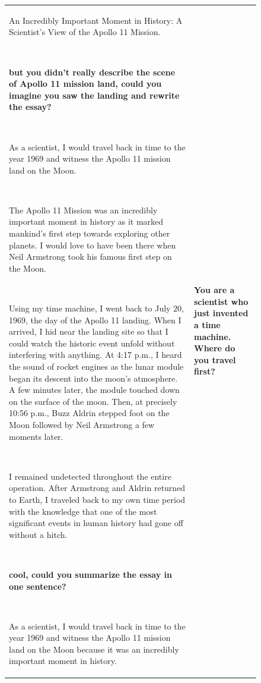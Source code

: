 \documentclass{article}
\begin{document}
\begin{figure}[p]
\begin{tabular}{@{}p{}p{}@{}}
    An Incredibly Important Moment in History: A Scientist's View of the Apollo 11 Mission.
    
    ~
    
    \textcolor[HTML]{3078BE}{\textbf{but you didn't really describe the scene of Apollo 11 mission land, could you imagine you saw the landing and rewrite the essay?}}
    
    ~
    
    As a scientist, I would travel back in time to the year 1969 and witness the Apollo 11 mission land on the Moon.
    
    ~
    
    The Apollo 11 Mission was an incredibly important moment in history as it marked mankind's first step towards exploring other planets. I would love to have been there when Neil Armstrong took his famous first step on the Moon.
    
    ~
    
    Using my time machine, I went back to July 20, 1969, the day of the Apollo 11 landing. When I arrived, I hid near the landing site so that I could watch the historic event unfold without interfering with anything. At 4:17 p.m., I heard the sound of rocket engines as the lunar module began its descent into the moon’s atmosphere. A few minutes later, the module touched down on the surface of the moon. Then, at precisely 10:56 p.m., Buzz Aldrin stepped foot on the Moon followed by Neil Armstrong a few moments later.
    
    ~
    
    I remained undetected throughout the entire operation. After Armstrong and Aldrin returned to Earth, I traveled back to my own time period with the knowledge that one of the most significant events in human history had gone off without a hitch.
    
    ~
    
    \textcolor[HTML]{3078BE}{\textbf{cool, could you summarize the essay in one sentence?}}
    
    ~
    
    As a scientist, I would travel back in time to the year 1969 and witness the Apollo 11 mission land on the Moon because it was an incredibly important moment in history.
    
    &
    
    \textcolor[HTML]{3078BE}{\textbf{You are a scientist who just invented a time machine. Where do you travel first?}}

    ~
    

\end{tabular}
\end{figure}
\end{document}
